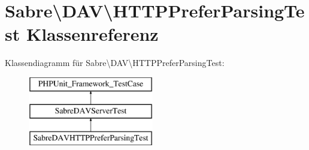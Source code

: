 \hypertarget{class_sabre_1_1_d_a_v_1_1_h_t_t_p_prefer_parsing_test}{}\section{Sabre\textbackslash{}D\+AV\textbackslash{}H\+T\+T\+P\+Prefer\+Parsing\+Test Klassenreferenz}
\label{class_sabre_1_1_d_a_v_1_1_h_t_t_p_prefer_parsing_test}
Klassendiagramm für Sabre\textbackslash{}D\+AV\textbackslash{}H\+T\+T\+P\+Prefer\+Parsing\+Test\+:\begin{figure}[H]
\begin{center}
\leavevmode
\includegraphics[height=3.000000cm]{class_sabre_1_1_d_a_v_1_1_h_t_t_p_prefer_parsing_test}
\end{center}
\end{figure}
